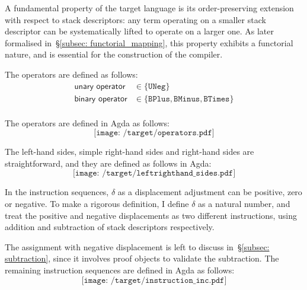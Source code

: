 \documentclass[12pt,a4paper]{report}
\theoremstyle{definition}
\newcommand{\secref}[1]{\S\ref{#1}}
\begin{document}
    A fundamental property of the target language is its order-preserving extension with respect to stack descriptors: any term operating on a smaller stack descriptor can be systematically lifted to operate on a larger one. As later formalised in~\secref{subsec: functorial_mapping}, this property exhibits a functorial nature, and is essential for the construction of the compiler.

    The operators are defined as follows:
    \[\begin{aligned}
        \textsf{unary operator} &\in \{\texttt{UNeg}\} \\
        \textsf{binary operator} &\in \{\texttt{BPlus}, \texttt{BMinus}, \texttt{BTimes}\} \\
    \end{aligned}\]

    The operators are defined in Agda as follows:
    \[\texttt{[image: /target/operators.pdf]}\]

    The left-hand sides, simple right-hand sides and right-hand sides are straightforward, and they are defined as follows in Agda:
    \[\texttt{[image: /target/leftrighthand\_sides.pdf]}\]

    In the instruction sequences, $\delta$ as a displacement adjustment can be positive, zero or negative. To make a rigorous definition, I define $\delta$ as a natural number, and treat the positive and negative displacements as two different instructions, using addition and subtraction of stack descriptors respectively. 

    The assignment with negative displacement is left to discuss in~\secref{subsec: subtraction}, since it involves proof objects to validate the subtraction. 
    The remaining instruction sequences are defined in Agda as follows:
    \[\texttt{[image: /target/instruction\_inc.pdf]}\]
\end{document}
